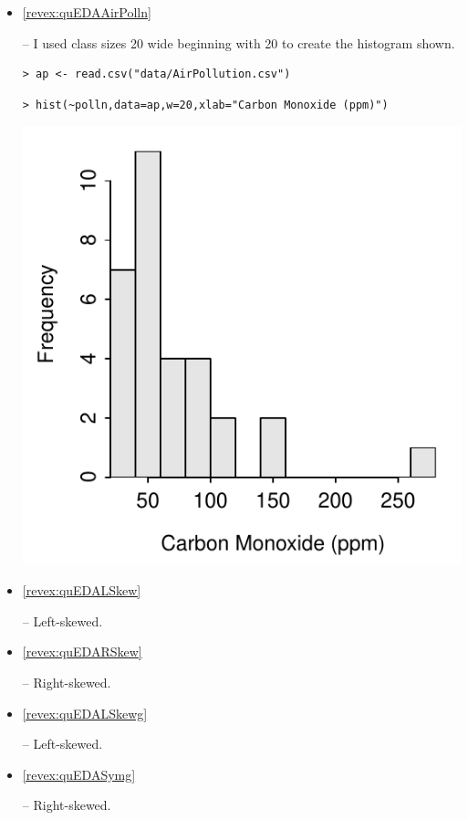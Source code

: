 \documentclass[10pt,openany]{book}\usepackage[]{graphicx}\usepackage[]{color}
\makeatletter
\newenvironment{kframe}{%
 \def\at@end@of@kframe{}%
 \ifinner\ifhmode%
  \def\at@end@of@kframe{\end{minipage}}%
  \begin{minipage}{\columnwidth}%
 \fi\fi%
 \def\FrameCommand##1{\hskip\@totalleftmargin \hskip-\fboxsep
 \colorbox{shadecolor}{##1}\hskip-\fboxsep
     \hskip-\linewidth \hskip-\@totalleftmargin \hskip\columnwidth}%
 \MakeFramed {\advance\hsize-\width
   \@totalleftmargin\z@ \linewidth\hsize
   \@setminipage}}%
 {\par\unskip\endMakeFramed%
 \at@end@of@kframe}
\newenvironment{knitrout}{}{} %
\makeatother
\begin{document}
\begin{itemize}
\begin{knitrout}
\end{knitrout}

  \item \hypertarget{ans:quEDAAirPolln}{\ref{revex:quEDAAirPolln}} -- I used class sizes 20 wide beginning with 20 to create the histogram shown.

\begin{knitrout}
\color{fgcolor}\begin{kframe}
\begin{verbatim}
> ap <- read.csv("data/AirPollution.csv")
\end{verbatim}
\end{kframe}
\end{knitrout}
\begin{knitrout}
\color{fgcolor}\begin{kframe}
\begin{verbatim}
> hist(~polln,data=ap,w=20,xlab="Carbon Monoxide (ppm)")
\end{verbatim}
\end{kframe}

{\centering \includegraphics[width=.4\linewidth]{Figs/HistAirPolln-1} 

}



\end{knitrout}

  \item \hypertarget{ans:quEDALSkew}{\ref{revex:quEDALSkew}} --  Left-skewed.

  \item \hypertarget{ans:quEDARSkew}{\ref{revex:quEDARSkew}} --  Right-skewed.

  \item \hypertarget{ans:quEDALSkewg}{\ref{revex:quEDALSkewg}} --  Left-skewed.

  \item \hypertarget{ans:quEDASymg}{\ref{revex:quEDASymg}} --  Right-skewed.


\end{itemize}
\end{document}
